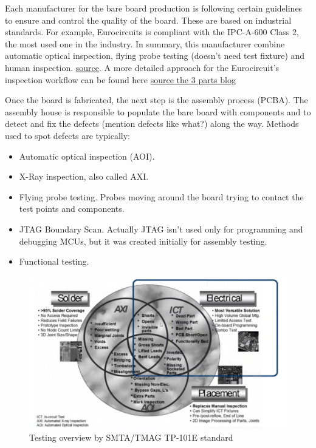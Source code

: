 \documentclass[12pt]{article}
\begin{document}
Each manufacturer for the bare board production is following certain guidelines to ensure and control the quality of the board. These are based on industrial standards. For example, Eurocircuits is compliant with the IPC-A-600 Class 2, the most used one in the industry. In summary, this manufacturer combine  automatic optical inspection, flying probe testing (doesn't need test fixture) and human inspection. \href{https://www.eurocircuits.com/making-a-pcb-pcb-manufacture-step-by-step/}{source}. A more detailed approach for the Eurocircuit's inspection workflow can be found here  \href{https://www.eurocircuits.com/blog/how-do-we-assure-the-quality-of-your-pcb-part-1/}{source the 3 parts blog}

Once the board is fabricated, the next step is the assembly process (PCBA). The assembly house is responsible to populate the bare board with components and to detect and fix the defects (mention defects like what?) along the way. Methods used to spot defects are typically:
\begin{itemize}
	\item Automatic optical inspection (AOI).
	\item X-Ray inspection, also called AXI.
	\item Flying probe testing. Probes moving around the board trying to contact the test points and components.
	\item JTAG Boundary Scan. Actually JTAG isn't used only for programming and debugging MCUs, but it was created initially for assembly testing.
	\item Functional testing. 
\end{itemize} 

\begin{figure}[h!]
	\centering
	\includegraphics[keepaspectratio, width = \textwidth]{assets/testing_overview.png}
	\caption{Testing overview by SMTA/TMAG TP-101E standard}
\end{figure}
\end{document}
